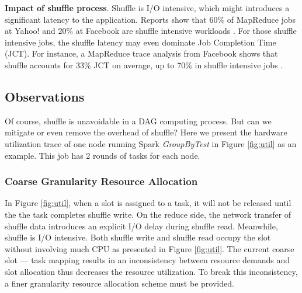 \textbf{Impact of shuffle process}. Shuffle is I/O intensive, which might introduces a significant latency to the application. 
Reports show that 60\% of MapReduce jobs at Yahoo! and 20\% at Facebook are shuffle intensive workloads \cite{shufflewatcher}. 
For those shuffle intensive jobs, the shuffle latency may even dominate Job Completion Time (JCT).
For instance, a MapReduce trace analysis from Facebook shows that shuffle accounts for 33\% JCT on average, up to 70\% in shuffle intensive jobs \cite{managing}.


\subsection{Observations} \label{observation}
Of course, shuffle is unavoidable in a DAG computing process. 
But can we mitigate or even remove the overhead of shuffle? 
Here we present the hardware utilization trace of one node running Spark \textit{GroupByTest} in Figure \ref{fig:util} as an example. 
This job has 2 rounds of tasks for each node.



\subsubsection{Coarse Granularity Resource Allocation}
In Figure \ref{fig:util}, when a slot is assigned to a task, it will not be released until the the task completes shuffle write. 
On the reduce side, the network transfer of shuffle data introduces an explicit I/O delay during shuffle read. 
Meanwhile, shuffle is I/O intensive. 
Both shuffle write and shuffle read occupy the slot without involving much CPU as presented in Figure \ref{fig:util}. 
The current coarse slot --- task mapping results in an inconsistency between resource demands and slot allocation thus decreases the resource utilization. 
To break this inconsistency, a finer granularity resource allocation scheme must be provided.

